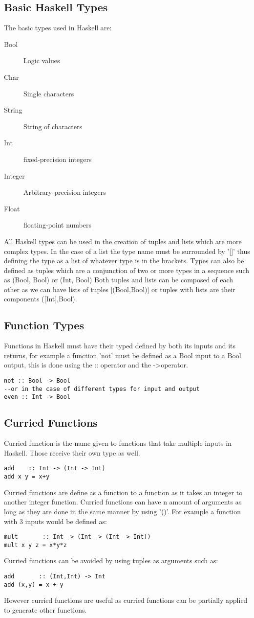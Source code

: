 \documentclass[12pt, oneside]{article}
\begin{document}
\subsection{Basic Haskell Types}
The basic types used in Haskell are:
\begin{description}
    \item[Bool]{Logic values}
    \item[Char]{Single characters}
    \item[String]{String of characters}
    \item[Int]{fixed-precision integers}
    \item[Integer]{Arbitrary-precision integers}
    \item[Float]{floating-point numbers}
\end{description}
All Haskell types can be used in the creation of tuples and lists which are more complex types. In the case of a list the type name must be surrounded by '[]'
thus defining the type as a list of whatever type is in the brackets. Types can also be defined as tuples which are a conjunction of two or more types in a sequence such as (Bool, Bool) or (Int, Bool)
Both tuples and lists can be composed of each other as we can have lists of tuples [(Bool,Bool)] or tuples with lists are their components ([Int],Bool).

\subsection{Function Types}
Functions in Haskell must have their typed defined by both its inputs and its returns, for example a function 'not' must be defined as a Bool input to a Bool output, this is done using the :: operator and the -\textgreater operator.
\begin{lstlisting}
not :: Bool -> Bool
--or in the case of different types for input and output
even :: Int -> Bool
\end{lstlisting}
\subsection{Curried Functions}
Curried function is the name given to functions that take multiple inputs in Haskell. Those receive their own type as well.
\begin{lstlisting}
add    :: Int -> (Int -> Int)
add x y = x+y
\end{lstlisting}
Curried functions are define as a function to a function as it takes an integer to another integer function. Curried functions can have n amount of arguments as long as they are done in the same manner by using '()'. For example a function with 3 inputs would be defined as:
\begin{lstlisting}
mult       :: Int -> (Int -> (Int -> Int))
mult x y z = x*y*z
\end{lstlisting}
Curried functions can be avoided by using tuples as arguments such as:
\begin{lstlisting}
add       :: (Int,Int) -> Int
add (x,y) = x + y
\end{lstlisting}
However curried functions are useful as curried functions can be partially applied to generate other functions.
\end{document}
